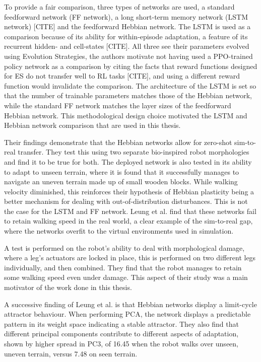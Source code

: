 \documentclass{article} %
\begin{document}
To provide a fair comparison, three types of networks are used, a standard feedforward network (FF network), a long short-term memory network (LSTM network) [CITE] and the feedforward Hebbian network. The LSTM is used as a comparison because of its ability for within-episode adaptation, a feature of its recurrent hidden- and cell-states [CITE]. All three see their parameters evolved using Evolution Strategies, the authors motivate not having used a PPO-trained policy network as a comparison by citing the facts that reward functions designed for ES do not transfer well to RL tasks [CITE], and using a different reward function would invalidate the comparison. The architecture of the LSTM is set so that the number of trainable parameters matches those of the Hebbian network, while the standard FF network matches the layer sizes of the feedforward Hebbian network. This methodological design choice motivated the LSTM and Hebbian network comparison that are used in this thesis. 

Their findings demonstrate that the Hebbian networks allow for zero-shot sim-to-real transfer. They test this using two separate bio-inspired robot morphologies and find it to be true for both. The deployed network is also tested in its ability to adapt to unseen terrain, where it is found that it successfully manages to navigate an uneven terrain made up of small wooden blocks. While walking velocity diminished, this reinforces their hypothesis of Hebbian plasticity being a better mechanism for dealing with out-of-distribution disturbances. This is not the case for the LSTM and FF network. Leung et al. find that these networks fail to retain walking speed in the real world, a clear example of the sim-to-real gap, where the networks overfit to the virtual environments used in simulation.

A test is performed on the robot's ability to deal with morphological damage, where a leg's actuators are locked in place, this is performed on two different legs individually, and then combined. They find that the robot manages to retain some walking speed even under damage. This aspect of their study was a main motivator of the work done in this thesis. 

A successive finding of Leung et al. is that Hebbian networks display a limit-cycle attractor behaviour. When performing PCA, the network displays a predictable pattern in its weight space indicating a stable attractor. They also find that different principal components contribute to different aspects of adaptation, shown by higher spread in PC3, of 16.45 when the robot walks over unseen, uneven terrain, versus 7.48 on seen terrain.   
\end{document}
